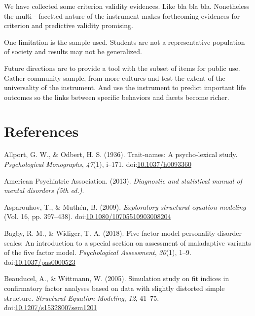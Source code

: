 \documentclass[man]{apa6}
\theoremstyle{definition}
\theoremstyle{definition}
\theoremstyle{definition}
\theoremstyle{remark}
\begin{document}
We have collected some criterion validity evidences. Like bla bla bla.
Nonetheless the multi - facetted nature of the instrument makes
forthcoming evidences for criterion and predictive validity promising.

One limitation is the sample used. Students are not a representative
population of society and results may not be generalized.

Future directions are to provide a tool with the subset of items for
public use. Gather community sample, from more cultures and test the
extent of the universality of the instrument. And use the instrument to
predict important life outcomes so the links between specific behaviors
and facets become richer.

\newpage

\hypertarget{references}{%
\section{References}\label{references}}

\begingroup
\setlength{\parindent}{-0.5in}
\setlength{\leftskip}{0.5in}

\hypertarget{refs}{}
\leavevmode\hypertarget{ref-AllportOdbert1936}{}%
Allport, G. W., \& Odbert, H. S. (1936). Trait-names: A psycho-lexical
study. \emph{Psychological Monographs}, \emph{47}(1), i--171.
doi:\href{https://doi.org/10.1037/h0093360}{10.1037/h0093360}

\leavevmode\hypertarget{ref-APA2013}{}%
American Psychiatric Association. (2013). \emph{Diagnostic and
statistical manual of mental disorders (5th ed.)}.

\leavevmode\hypertarget{ref-AsparouhovMuthen2009}{}%
Asparouhov, T., \& Muthén, B. (2009). \emph{Exploratory structural
equation modeling} (Vol. 16, pp. 397--438).
doi:\href{https://doi.org/10.1080/10705510903008204}{10.1080/10705510903008204}

\leavevmode\hypertarget{ref-Bagby2018}{}%
Bagby, R. M., \& Widiger, T. A. (2018). Five factor model personality
disorder scales: An introduction to a special section on assessment of
maladaptive variants of the five factor model. \emph{Psychological
Assessment}, \emph{30}(1), 1--9.
doi:\href{https://doi.org/10.1037/pas0000523}{10.1037/pas0000523}

\leavevmode\hypertarget{ref-Beauducel2005}{}%
Beauducel, A., \& Wittmann, W. (2005). Simulation study on fit indices
in confirmatory factor analyses based on data with slightly distorted
simple structure. \emph{Structural Equation Modeling}, \emph{12},
41--75.
doi:\href{https://doi.org/10.1207/s15328007sem1201}{10.1207/s15328007sem1201}
\end{document}
